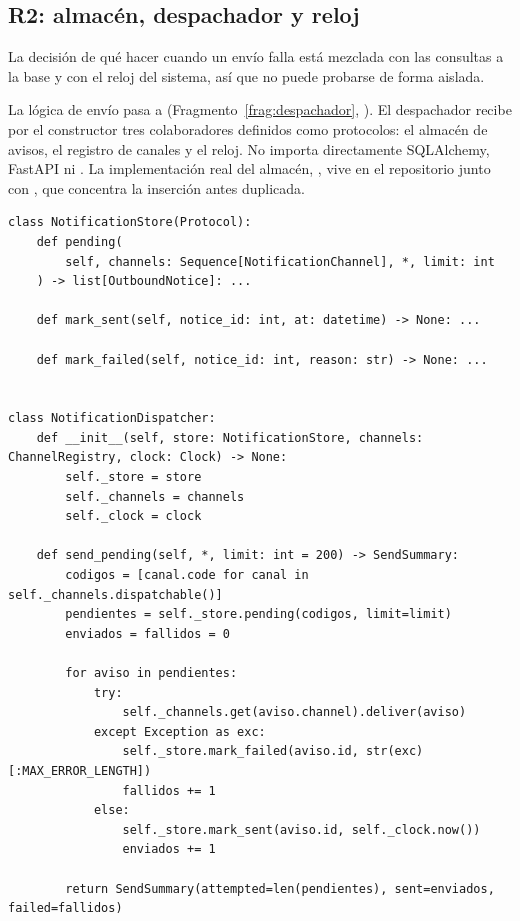 \documentclass[11pt,a4paper]{article}
\begin{document}
\subsection{R2: almacén, despachador y reloj}

 La decisión de qué hacer cuando un envío falla está mezclada con las consultas a la base y con el reloj del sistema, así que no puede probarse de forma aislada.

 La lógica de envío pasa a  (Fragmento~\ref{frag:despachador}, ). El despachador recibe por el constructor tres colaboradores definidos como protocolos: el almacén de avisos, el registro de canales y el reloj. No importa directamente SQLAlchemy, FastAPI ni . La implementación real del almacén, , vive en el repositorio junto con , que concentra la inserción antes duplicada.

\begin{lstlisting}[float=htbp,caption={\ev{E-07}. Despachador con dependencias inyectadas (\cod{services/notification\_dispatcher.py}).},label=frag:despachador]
class NotificationStore(Protocol):
    def pending(
        self, channels: Sequence[NotificationChannel], *, limit: int
    ) -> list[OutboundNotice]: ...

    def mark_sent(self, notice_id: int, at: datetime) -> None: ...

    def mark_failed(self, notice_id: int, reason: str) -> None: ...


class NotificationDispatcher:
    def __init__(self, store: NotificationStore, channels: ChannelRegistry, clock: Clock) -> None:
        self._store = store
        self._channels = channels
        self._clock = clock

    def send_pending(self, *, limit: int = 200) -> SendSummary:
        codigos = [canal.code for canal in self._channels.dispatchable()]
        pendientes = self._store.pending(codigos, limit=limit)
        enviados = fallidos = 0

        for aviso in pendientes:
            try:
                self._channels.get(aviso.channel).deliver(aviso)
            except Exception as exc:
                self._store.mark_failed(aviso.id, str(exc)[:MAX_ERROR_LENGTH])
                fallidos += 1
            else:
                self._store.mark_sent(aviso.id, self._clock.now())
                enviados += 1

        return SendSummary(attempted=len(pendientes), sent=enviados, failed=fallidos)
\end{lstlisting}
\end{document}
